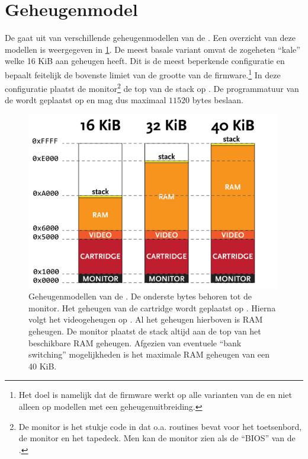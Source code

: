 %
%
%
\section{Geheugenmodel}
\label{sec:memory-model}

De \product gaat uit van verschillende geheugenmodellen van de . Een overzicht van deze modellen is weergegeven in \cref{fig:memory-models}. De meest basale variant omvat de zogeheten ``kale''  welke 16 KiB aan geheugen heeft. Dit is de meest beperkende configuratie en bepaalt feitelijk de bovenste limiet van de grootte van de firmware.\footnote{Het doel is namelijk dat de firmware werkt op alle varianten van de  en niet alleen op modellen met een geheugenuitbreiding.} In deze configuratie plaatst de monitor\footnote{De monitor is het stukje code in  dat o.a. routines bevat voor het toetsenbord, de monitor en het tapedeck. Men kan de monitor zien als de ``BIOS'' van de .} de top van de stack op . De programmatuur van de \product wordt geplaatst op  en mag dus maximaal $11520$ bytes beslaan.

\begin{figure}[h!]
    \centering
    \includegraphics[width=0.99\textwidth]{img/memory_models.png}
    \caption{Geheugenmodellen van de . De onderste  bytes behoren tot de monitor. Het geheugen van de  cartridge wordt geplaatst op . Hierna volgt het videogeheugen op . Al het geheugen hierboven is RAM geheugen. De monitor plaatst de stack altijd aan de top van het beschikbare RAM geheugen. Afgezien van eventuele ``bank switching'' mogelijkheden is het maximale RAM geheugen van een  40 KiB.}
    \label{fig:memory-models}
\end{figure}

